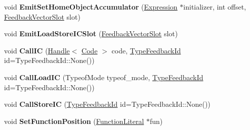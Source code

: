 \begin{DoxyCompactItemize}
\item 
void {\bfseries Emit\+Set\+Home\+Object\+Accumulator} (\hyperlink{classv8_1_1internal_1_1_expression}{Expression} $\ast$initializer, int offset, \hyperlink{classv8_1_1internal_1_1_feedback_vector_slot}{Feedback\+Vector\+Slot} slot)\hypertarget{classv8_1_1internal_1_1_full_code_generator_a022592c916952f772e046469dedf2daf}{}\label{classv8_1_1internal_1_1_full_code_generator_a022592c916952f772e046469dedf2daf}

\item 
void {\bfseries Emit\+Load\+Store\+I\+C\+Slot} (\hyperlink{classv8_1_1internal_1_1_feedback_vector_slot}{Feedback\+Vector\+Slot} slot)\hypertarget{classv8_1_1internal_1_1_full_code_generator_abc6a427665aff4e6da8d19985d158248}{}\label{classv8_1_1internal_1_1_full_code_generator_abc6a427665aff4e6da8d19985d158248}

\item 
void {\bfseries Call\+IC} (\hyperlink{classv8_1_1internal_1_1_handle}{Handle}$<$ \hyperlink{classv8_1_1internal_1_1_code}{Code} $>$ code, \hyperlink{classv8_1_1internal_1_1_type_feedback_id}{Type\+Feedback\+Id} id=Type\+Feedback\+Id\+::\+None())\hypertarget{classv8_1_1internal_1_1_full_code_generator_aafe9695a2d617a0f8ca8e228f1847496}{}\label{classv8_1_1internal_1_1_full_code_generator_aafe9695a2d617a0f8ca8e228f1847496}

\item 
void {\bfseries Call\+Load\+IC} (Typeof\+Mode typeof\+\_\+mode, \hyperlink{classv8_1_1internal_1_1_type_feedback_id}{Type\+Feedback\+Id} id=Type\+Feedback\+Id\+::\+None())\hypertarget{classv8_1_1internal_1_1_full_code_generator_a4562a7eb90cbcfd968ea10b22b53c435}{}\label{classv8_1_1internal_1_1_full_code_generator_a4562a7eb90cbcfd968ea10b22b53c435}

\item 
void {\bfseries Call\+Store\+IC} (\hyperlink{classv8_1_1internal_1_1_type_feedback_id}{Type\+Feedback\+Id} id=Type\+Feedback\+Id\+::\+None())\hypertarget{classv8_1_1internal_1_1_full_code_generator_a913d6665305e0fc108598b1beffb4cb6}{}\label{classv8_1_1internal_1_1_full_code_generator_a913d6665305e0fc108598b1beffb4cb6}

\item 
void {\bfseries Set\+Function\+Position} (\hyperlink{classv8_1_1internal_1_1_function_literal}{Function\+Literal} $\ast$fun)\hypertarget{classv8_1_1internal_1_1_full_code_generator_a9a63d7130248010986653f3d964a54e9}{}\label{classv8_1_1internal_1_1_full_code_generator_a9a63d7130248010986653f3d964a54e9}


\end{DoxyCompactItemize}

